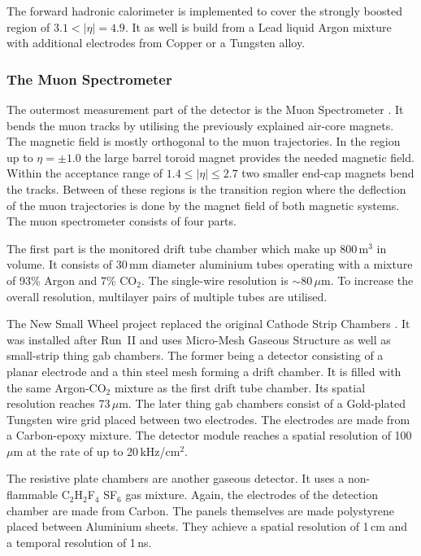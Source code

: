 \documentclass[bachelor,ngerman,english]{GAUBM}
\begin{document}
The forward hadronic calorimeter \cite{atlas:tech_design_report_01} is implemented to cover the strongly boosted region of $3.1<|\eta|=4.9$. It as well is build from a Lead liquid Argon mixture with additional electrodes from Copper or a Tungsten alloy.

\subsubsection*{The Muon Spectrometer}
The outermost measurement part of the \atlas detector is the Muon Spectrometer \cite{atlas:tech_design_report_01,atlas:muon_chamber}. It bends the muon tracks by utilising the previously explained air-core magnets. The magnetic field is mostly orthogonal to the muon trajectories. In the region up to $\eta=\pm1.0$ the large barrel toroid magnet provides the needed magnetic field. Within the acceptance range of $1.4\leq|\eta|\leq2.7$ two smaller end-cap magnets bend the tracks. Between of these regions is the transition region where the deflection of the muon trajectories is done by the magnet field of both magnetic systems. The muon spectrometer consists of four parts.

The first part is the monitored drift tube chamber which make up 800\,m$^3$ in volume. It consists of 30\,mm diameter aluminium tubes operating with a mixture of 93\% Argon and 7\% CO$_2$. The single-wire resolution is $\sim$80\,$\mu$m. To increase the overall resolution, multilayer pairs of multiple tubes are utilised.

The New Small Wheel project replaced the original Cathode Strip Chambers \cite{atlas:muon_chamber,atlas:muon_chamber_upgrade,atlas:new_small_wheel}. It was installed after Run~II and uses Micro-Mesh Gaseous Structure as well as small-strip thing gab chambers. The former being a detector consisting of a planar electrode and a thin steel mesh forming a drift chamber. It is filled with the same Argon-CO$_2$ mixture as the first drift tube chamber. Its spatial resolution reaches 73\,$\mu$m. The later thing gab chambers consist of a Gold-plated Tungsten wire grid placed between two electrodes. The electrodes are made from a Carbon-epoxy mixture. The detector module reaches a spatial resolution of 100\,$\mu$m at the rate of up to 20\,kHz/cm$^2$.

The resistive plate chambers \cite{atlas:tech_design_report_01,atlas:muon_chamber,atlas:muon_chamber_upgrade} are another gaseous detector. It uses a non-flammable C$_2$H$_2$F$_4$ SF$_6$ gas mixture. Again, the electrodes of the detection chamber are made from Carbon. The panels themselves are made polystyrene placed between Aluminium sheets. They achieve a spatial resolution of 1\,cm and a temporal resolution of 1\,ns.
\end{document}
